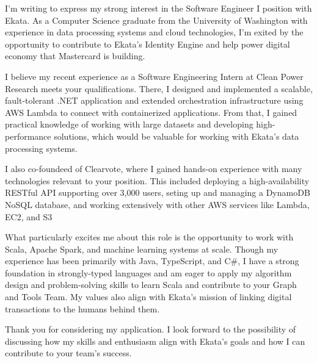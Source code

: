 I'm writing to express my strong interest in the Software Engineer I position with Ekata. As a Computer Science graduate from the University of Washington with experience in data processing systems and cloud technologies, I'm exited by the opportunity to contribute to Ekata's Identity Engine and help power digital economy that Mastercard is building.

I believe my recent experience as a Software Engineering Intern at Clean Power Research meets your qualifications. There, I designed and implemented a scalable, fault-tolerant .NET application and extended orchestration infrastructure using AWS Lambda to connect with containerized applications. From that, I gained practical knowledge of working with large datasets and developing high-performance solutions, which would be valuable for working with Ekata's data processing systems.

I also co-foundeed of Clearvote, where I gained hands-on experience with many technologies relevant to your position. This included deploying a high-availability RESTful API supporting over 3,000 users, seting up and managing a DynamoDB NoSQL database, and working extensively with other AWS services like Lambda, EC2, and S3

What particularly excites me about this role is the opportunity to work with Scala, Apache Spark, and machine learning systems at scale. Though my experience has been primarily with Java, TypeScript, and C\#, I have a strong foundation in strongly-typed languages and am eager to apply my algorithm design and problem-solving skills to learn Scala and contribute to your Graph and Tools Team. My values also align with Ekata's mission of linking digital transactions to the humans behind them.

Thank you for considering my application. I look forward to the possibility of discussing how my skills and enthusiasm align with Ekata's goals and how I can contribute to your team's success.